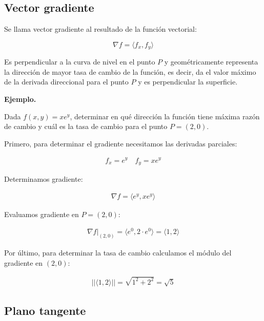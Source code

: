 \subsection{Vector gradiente}

Se llama vector gradiente al resultado de la función vectorial:

\begin{equation*}
    \nabla f = \langle f_x, f_y \rangle
\end{equation*}

Es perpendicular a la curva de nivel en el punto \(P\) 
y geométricamente representa la dirección de mayor tasa de cambio de la función,
es decir,
da el valor máximo de la derivada direccional para el punto \(P\) 
y es perpendicular la superficie.

\vspace{.5cm}
\textbf{Ejemplo.}

Dada \(f(x,y)=xe^{y}\), 
determinar en qué dirección la función tiene máxima razón de cambio
y cuál es la tasa de cambio para el punto \(P = (2,0)\).

Primero,
para determinar el gradiente necesitamos las derivadas parciales:

\begin{align*}
    f_x = e^{y} \quad f_y = xe^{y}
\end{align*}

Determinamos gradiente:

\begin{align*}
    \nabla f = \langle e^{y}, xe^{y} \rangle
\end{align*}

Evaluamos gradiente en \(P = (2,0)\):

\begin{align*}
    \nabla f|_{(2,0)} = \langle e^{0}, 2\cdot e^{0} \rangle = \langle1,2\rangle
\end{align*}

Por último,
para determinar la tasa de cambio calculamos el módulo del gradiente en \((2,0)\):

\begin{align*}
    ||\langle1,2\rangle|| = \sqrt{1^{2} + 2^{2}} = \boxed{\sqrt{5}}
\end{align*}

\subsection{Plano tangente}

